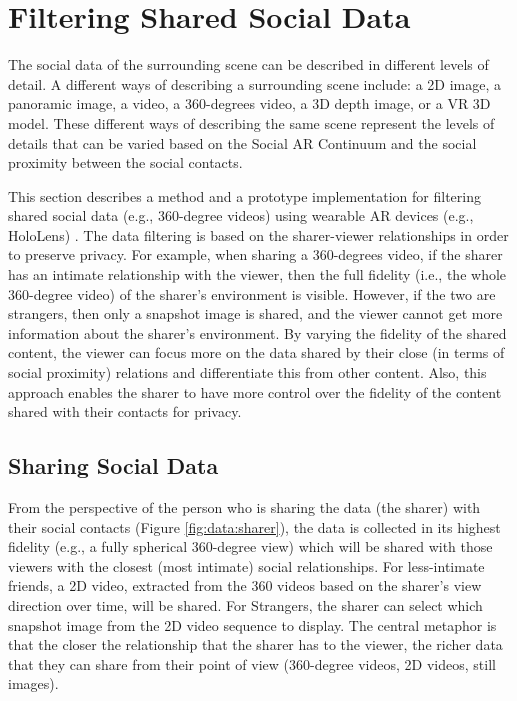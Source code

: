 \section{Filtering Shared Social Data}
\label{sec:surrounding:360}

The social data of the surrounding scene can be described in different levels of detail. A different ways of describing a surrounding scene include: a 2D image, a panoramic image, a video, a 360-degrees video, a 3D depth image, or a VR 3D model. These different ways of describing the same scene represent the levels of details that can be varied based on the Social AR Continuum and the social proximity between the social contacts. 

This section describes a method and a prototype implementation for filtering shared social data (e.g., 360-degree videos) using wearable AR devices (e.g., HoloLens) \cite{Nassani2018a}. The data filtering is based on the sharer-viewer relationships in order to preserve privacy. For example, when sharing a 360-degrees video, if the sharer has an intimate relationship with the viewer, then the full fidelity (i.e., the whole 360-degree video) of the sharer's environment is visible. However, if the two are strangers, then only a snapshot image is shared, and the viewer cannot get more information about the sharer's environment. By varying the fidelity of the shared content, the viewer can focus more on the data shared by their close (in terms of social proximity) relations and differentiate this from other content. Also, this approach enables the sharer to have more control over the fidelity of the content shared with their contacts for privacy.



\subsection{Sharing Social Data}

From the perspective of the person who is sharing the data (the sharer) with their social contacts (Figure \ref{fig:data:sharer}), the data is collected in its highest fidelity (e.g., a fully spherical 360-degree view) which will be shared with those viewers with the closest (most intimate) social relationships. For less-intimate friends, a 2D video, extracted from the 360 videos based on the sharer's view direction over time, will be shared. For Strangers, the sharer can select which snapshot image from the 2D video sequence to display. The central metaphor is that the closer the relationship that the sharer has to the viewer, the richer data that they can share from their point of view (360-degree videos, 2D videos, still images).

